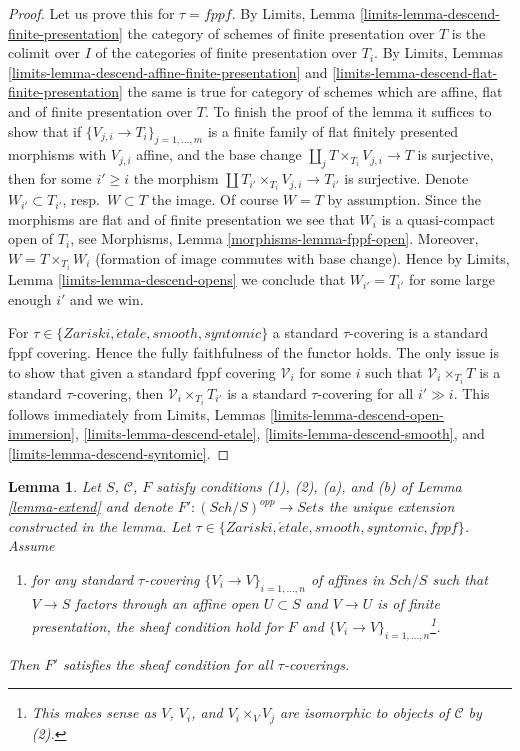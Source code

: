 \documentclass{stacks-project}
\theoremstyle{plain}
\newtheorem{lemma}[subsection]{Lemma}
\theoremstyle{definition}
\theoremstyle{remark}
\numberwithin{equation}{subsection}
\def\Sch{\mathit{Sch}}
\def\etale{{\acute{e}tale}}
\begin{document}
\begin{proof}
Let us prove this for $\tau = fppf$.
By Limits, Lemma \ref{limits-lemma-descend-finite-presentation}
the category of schemes of finite presentation over $T$ is the
colimit over $I$ of the categories of finite presentation over $T_i$. By
Limits, Lemmas \ref{limits-lemma-descend-affine-finite-presentation}
and \ref{limits-lemma-descend-flat-finite-presentation}
the same is true for category of schemes which are affine, flat and
of finite presentation over $T$.
To finish the proof of the lemma it suffices to show that if
$\{V_{j, i} \to T_i\}_{j = 1, \ldots, m}$ is a finite family of
flat finitely presented morphisms with $V_{j, i}$ affine, and the
base change $\coprod_j T \times_{T_i} V_{j, i} \to T$ is surjective,
then for some $i' \geq i$ the morphism
$\coprod T_{i'} \times_{T_i} V_{j, i} \to T_{i'}$ is surjective.
Denote $W_{i'} \subset T_{i'}$, resp.\ $W \subset T$ the image.
Of course $W = T$ by assumption.
Since the morphisms are flat and of finite presentation we see that
$W_i$ is a quasi-compact open of $T_i$, see
Morphisms, Lemma \ref{morphisms-lemma-fppf-open}.
Moreover, $W = T \times_{T_i} W_i$ (formation of image commutes
with base change). Hence by
Limits, Lemma \ref{limits-lemma-descend-opens}
we conclude that $W_{i'} = T_{i'}$ for some large enough $i'$
and we win.

\medskip\noindent
For $\tau \in \{Zariski, \etale, smooth, syntomic\}$ a standard $\tau$-covering
is a standard fppf covering. Hence the fully faithfulness of the functor
holds. The only issue is to show that given a standard fppf covering
$\mathcal{V}_i$ for some $i$ such that $\mathcal{V}_i \times_{T_i} T$
is a standard $\tau$-covering, then $\mathcal{V}_i \times_{T_i} T_{i'}$
is a standard $\tau$-covering for all $i' \gg i$. This follows immediately
from Limits, Lemmas
\ref{limits-lemma-descend-open-immersion},
\ref{limits-lemma-descend-etale},
\ref{limits-lemma-descend-smooth}, and
\ref{limits-lemma-descend-syntomic}.
\end{proof}

\begin{lemma}
\label{lemma-extend-sheaf-general}
Let $S$, $\mathcal{C}$, $F$ satisfy conditions (1), (2), (a), and (b) of
Lemma \ref{lemma-extend} and denote $F' : (\Sch/S)^{opp} \to \textit{Sets}$
the unique extension constructed in the lemma. Let
$\tau \in \{Zariski, \etale, smooth, syntomic, fppf\}$. Assume
\begin{enumerate}
\item[(c)] for any standard $\tau$-covering $\{V_i \to V\}_{i = 1, \ldots, n}$
of affines in $\Sch/S$ such that $V \to S$ factors through an affine open
$U \subset S$ and $V \to U$ is of finite presentation, the sheaf condition
hold for $F$ and $\{V_i \to V\}_{i = 1, \ldots, n}$\footnote{This makes
sense as $V$, $V_i$, and $V_i \times_V V_j$ are isomorphic to objects
of $\mathcal{C}$ by (2).}.
\end{enumerate}
Then $F'$ satisfies the sheaf condition for all $\tau$-coverings.
\end{lemma}
\end{document}

